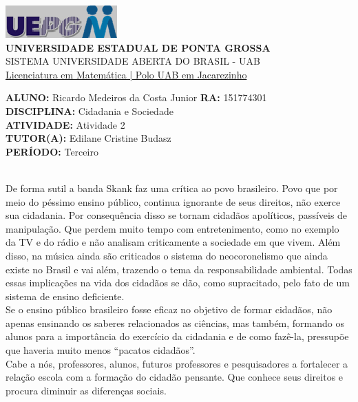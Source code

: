 \documentclass[a4paper, 12pt]{article}
\begin{document}
\begin{flushleft}\includegraphics{logo}\\
\textbf{UNIVERSIDADE ESTADUAL DE PONTA GROSSA} \\
SISTEMA UNIVERSIDADE ABERTA DO BRASIL - UAB \\
\underline{Licenciatura em Matemática | Polo UAB em Jacarezinho}\end{flushleft} 
\textbf{ALUNO:} Ricardo Medeiros da Costa Junior   \textbf{RA:} 151774301 \\
\textbf{DISCIPLINA:} Cidadania e Sociedade \\
\textbf{ATIVIDADE:} Atividade 2 \\
\textbf{TUTOR(A):} Edilane Cristine Budasz\\
\textbf{PERÍODO:} Terceiro \\ \\
\begin{itemize}
  De forma sutil a banda Skank faz uma crítica ao povo brasileiro. Povo que por meio do péssimo ensino público, continua ignorante de seus direitos, não exerce sua cidadania. Por consequência disso se tornam cidadãos apolíticos, passíveis de manipulação. Que perdem muito tempo com entretenimento, como no exemplo da TV e do rádio e não analisam criticamente a sociedade em que vivem. Além disso, na música ainda são criticados o sistema do neocoronelismo que ainda existe no Brasil e vai além, trazendo o tema da responsabilidade ambiental. Todas essas implicações na vida dos cidadãos se dão, como supracitado, pelo fato de um sistema de ensino deficiente. \\
  Se o ensino público brasileiro fosse eficaz no objetivo de formar cidadãos, não apenas ensinando os saberes relacionados as ciências, mas também, formando os alunos para a importância do exercício da cidadania e de como fazê-la, pressupõe que haveria muito menos ``pacatos cidadãos''. \\
  Cabe a nós, professores, alunos, futuros professores e pesquisadores a fortalecer a relação escola com a formação do cidadão pensante. Que conhece seus direitos e procura diminuir as diferenças sociais. 
  
\end{itemize}
\end{document}
